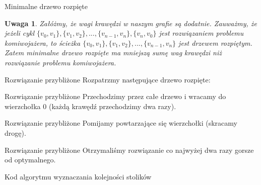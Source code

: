 \documentclass[a4paper,10pt]{beamer}
\newtheorem{uw}{Uwaga}[subsection]
\begin{document}
		\begin{frame}{Minimalne drzewo rozpięte}
			\begin{uw}
				Załóżmy, że wagi krawędzi w naszym grafie są dodatnie. Zauważmy, że jeżeli cykl $\{v_0, v_1\} , \{v_1, v_2\} , ... , \{v_{n-1}, v_n\} , \{v_n, v_0\}$ jest rozwiązaniem problemu komiwojażera, to ścieżka $\{v_0, v_1\} , \{v_1, v_2\} , ... , \{v_{n-1}, v_n\}$ jest drzewem rozpiętym. Zatem minimalne drzewo rozpięte ma mniejszą sumę wag krawędzi niż rozwiązanie problemu komiwojażera.
			\end{uw}
		\end{frame}
		\begin{frame}{Rozwiązanie przybliżone}
			Rozpatrzmy następujące drzewo rozpięte:
		\end{frame}
		\begin{frame}{Rozwiązanie przybliżone}
			Przechodzimy przez całe drzewo i wracamy do wierzchołka $0$ (każdą krawędź przechodzimy dwa razy).
		\end{frame}
		\begin{frame}{Rozwiązanie przybliżone}
			Pomijamy powtarzające się wierzchołki (skracamy drogę).
		\end{frame}
		\begin{frame}{Rozwiązanie przybliżone}
			Otrzymaliśmy rozwiązanie co najwyżej dwa razy gorsze od optymalnego.
		\end{frame}
		\begin{frame}{Kod algorytmu wyznaczania kolejności stolików}
		\end{frame}
\end{document}
